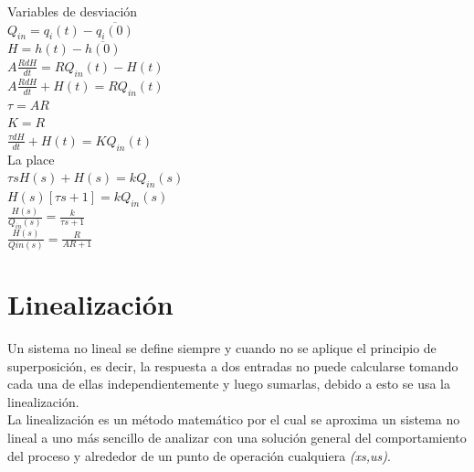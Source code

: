 \documentclass[a4paper,12pt,twoside]{proyectotanquesecci}
\begin{document}
Variables de desviación \\
$Q_{in}=q_{i}\left( t\right) -\overline {q_{i}\left( 0\right) }$ \\
$H=h\left( t\right) -\overline {h\left( 0\right) }$ \\

$A\frac {RdH}{dt}=RQ_{in}\left( t\right) -H\left( t\right)$ \\
$A\frac {RdH}{dt}+H\left( t\right) =RQ_{in}\left( t\right)$ \\
$\tau =AR$ \\
$K=R$ \\

$\frac {\tau dH}{dt}+H\left( t\right) =KQ_{in}\left( t\right)$ \\

La place \\
$\tau sH\left( s\right) +H\left( s\right) =kQ_{in}\left( s\right)$ \\
$H\left( s\right) \left[ \tau s+1\right] =kQ_{in}\left( s\right)$ \\
$\frac {H\left( s\right) }{Q_{in}\left( s\right) }=\frac {k}{\tau s+1}$ \\
$\frac {H\left( s\right) }{Qin\left( s\right) }=\frac {R}{AR+1}$ \\


\newpage




\section{Linealización}

Un sistema no lineal se define siempre y cuando no se aplique el principio de superposición, es decir, la respuesta a dos entradas no puede calcularse tomando cada una de ellas independientemente y luego sumarlas, debido a esto se usa la linealización.\\


La linealización es un método matemático por el cual se aproxima un sistema no lineal a uno más sencillo de analizar con una solución general del comportamiento del proceso y alrededor de un punto de operación cualquiera \textit{(xs,us)}.\\
\end{document}
